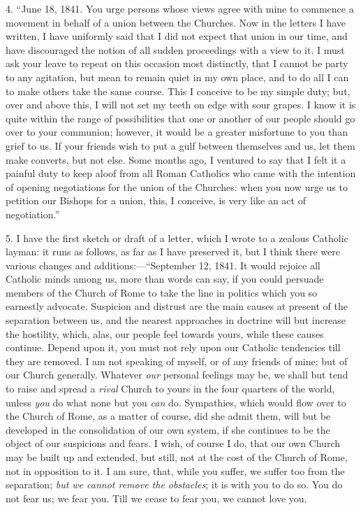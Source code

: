 4. ``June 18, 1841. You urge persons whose views agree with mine
to commence a movement in behalf of a union between the Churches. Now in
the letters I have written, I have uniformly said that I did not expect
that union in our time, and have discouraged the notion of all sudden
proceedings with a view to it. I must ask your leave to repeat on this
occasion most distinctly, that I cannot be party to any agitation, but
mean to remain quiet in my own place, and to do all I can to make others
take the same course. This I conceive to be my simple duty; but,
over and above this, I will not set my teeth on edge with sour grapes. I
know it is quite within the range of possibilities that one or another
of our people should go over to your communion; however, it would be a
greater misfortune to you than grief to us. If your friends wish to put
a gulf between themselves and us, let them make converts, but not else.
Some months ago, I ventured to say that I felt it a painful duty to keep
aloof from all Roman Catholics who came with the intention of opening
negotiations for the union of the Churches: when you now urge us to
petition our Bishops for a union, this, I conceive, is very like an act
of negotiation.''

5. I have the first sketch or draft of a letter, which I wrote to a
zealous Catholic layman: it runs as follows, as far as I have
preserved it, but I think there were various changes and
additions:—``September 12, 1841. It would
rejoice all Catholic minds among us, more than words can say, if you
could persuade members of the Church of Rome to take the line in
politics which you so earnestly advocate. Suspicion and distrust are the
main causes at present of the separation between us, and the nearest
approaches in doctrine will but increase the hostility, which, alas, our
people feel towards yours, while these causes continue. Depend upon it,
you must not rely upon our Catholic tendencies till they are removed. I
am not speaking of myself, or of any friends of mine; but of our Church
generally. Whatever \emph{our} personal feelings may be, we shall but tend to
raise and spread a \emph{rival} Church to yours in the four quarters of the
world, unless \emph{you} do what none but you \emph{can} do. Sympathies, which would
flow over to the Church of Rome, as a matter of course, did she admit
them, will but be developed in the consolidation of our own system, if
she continues to be the object of our suspicions and fears. I wish, of
course I do, that our own Church may be built up and extended, but
still, not at the cost of the Church of Rome, not in opposition to it. I
am sure, that, while you suffer, we suffer too from the separation; \emph{but
we cannot remove the obstacles}; it is with you to do so. You do not
fear us; we fear you. Till we cease to fear you, we cannot love you.

